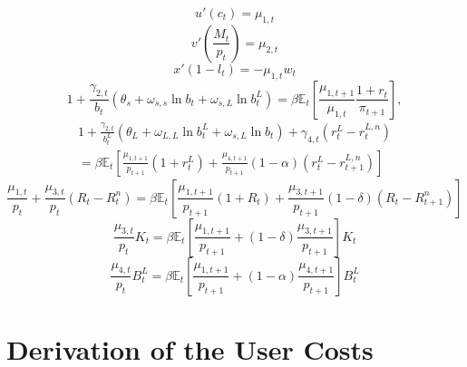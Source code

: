 \documentclass[11pt,a4paper,margin=1.5in]{article}
\begin{document}
\begin{equation}
	u'(c_t) = \mu_{1,t}
	\label{eq:HH_OC_c}
\end{equation}
%
\begin{equation}
	v'\left(\frac{M_t}{p_t}\right) = \mu_{2,t}
	\label{eq:HH_OC_M}
\end{equation}
%
\begin{equation}
	x'(1-l_t) = -\mu_{1,t}w_t
	\label{eq:HH_OC_l}
\end{equation}
%
\begin{equation}
	1 + \frac{\gamma_{2,t}}{b_t}\left(\theta_s + \omega_{s,s}\ln b_t + \omega_{s,L}\ln b^L_t\right) = \beta \mathbb{E}_t\!\left[\frac{\mu_{1,t+1}}{\mu_{1,t}}\frac{1+r_t}{\pi_{t+1}}\right],
	\label{eq:HH_OC_B}
\end{equation}
%
\begin{multline}
	1 + \frac{\gamma_{2,t}}{b^L_t}\left(\theta_L + \omega_{L,L}\ln b^L_t + \omega_{s,L}\ln b_t\right) + \gamma_{4,t}\left(r^L_t-r^{L,n}_t\right) \\ = \beta\mathbb{E}_t\!\left[\frac{\mu_{1,t+1}}{p_{t+1}}(1+r^L_{t}) + \frac{\mu_{4,{t+1}}}{p_{t+1}}(1-\alpha)\left(r^L_{t} - r^{L,n}_{t+1}\right)\right] 
	\label{eq:HH_OC_BL}
\end{multline}
%
\begin{equation}
	\frac{\mu_{1,t}}{p_t} + \frac{\mu_{3,t}}{p_t}\left(R_t - R^{n}_t\right) = \beta\mathbb{E}_t\!\left[\frac{\mu_{1,t+1}}{p_{t+1}}(1 + R_{t}) + \frac{\mu_{3,{t+1}}}{p_{t+1}}(1-\delta)\left(R_{t} - R^{n}_{t+1}\right)\right]
	\label{eq:HH_OC_K}
\end{equation}
%
\begin{equation}
	\frac{\mu_{3,t}}{p_t}K_t = \beta\mathbb{E}_t\!\left[\frac{\mu_{1,t+1}}{p_{t+1}} + (1-\delta)\frac{\mu_{3,{t+1}}}{p_{t+1}}\right]K_t
	\label{eq:HH_OC_R}
\end{equation}
%
\begin{equation}
	\frac{\mu_{4,t}}{p_t}B^L_t = \beta\mathbb{E}_t\!\left[\frac{\mu_{1,t+1}}{p_{t+1}} + (1-\alpha)\frac{\mu_{4,{t+1}}}{p_{t+1}}\right]B^L_t
	\label{eq:HH_OC_rL}
\end{equation}

\newpage
\section{Derivation of the User Costs}
\label{app:usercost_derivation}
\end{document}
